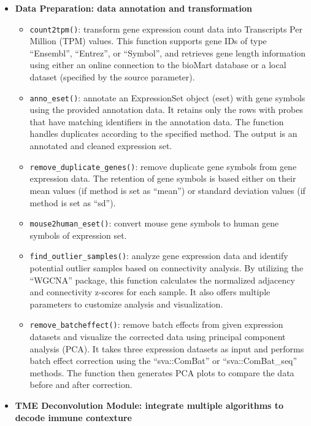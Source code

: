 \documentclass[
  12pt,
]{book}
\providecommand{\tightlist}{%
  \setlength{\itemsep}{0pt}\setlength{\parskip}{0pt}}
\begin{document}
\begin{itemize}
\item
  \textbf{Data Preparation: data annotation and transformation}

  \begin{itemize}
  \tightlist
  \item
    \texttt{count2tpm()}: transform gene expression count data into Transcripts Per Million (TPM) values. This function supports gene IDs of type ``Ensembl'', ``Entrez'', or ``Symbol'', and retrieves gene length information using either an online connection to the bioMart database or a local dataset (specified by the source parameter).
  \item
    \texttt{anno\_eset()}: annotate an ExpressionSet object (eset) with gene symbols using the provided annotation data. It retains only the rows with probes that have matching identifiers in the annotation data. The function handles duplicates according to the specified method. The output is an annotated and cleaned expression set.
  \item
    \texttt{remove\_duplicate\_genes()}: remove duplicate gene symbols from gene expression data. The retention of gene symbols is based either on their mean values (if method is set as ``mean'') or standard deviation values (if method is set as ``sd'').
  \item
    \texttt{mouse2human\_eset()}: convert mouse gene symbols to human gene symbols of expression set.
  \item
    \texttt{find\_outlier\_samples()}: analyze gene expression data and identify potential outlier samples based on connectivity analysis. By utilizing the ``WGCNA'' package, this function calculates the normalized adjacency and connectivity z-scores for each sample. It also offers multiple parameters to customize analysis and visualization.
  \item
    \texttt{remove\_batcheffect()}: remove batch effects from given expression datasets and visualize the corrected data using principal component analysis (PCA). It takes three expression datasets as input and performs batch effect correction using the ``sva::ComBat'' or ``sva::ComBat\_seq'' methods. The function then generates PCA plots to compare the data before and after correction.
  \end{itemize}
\item
  \textbf{TME Deconvolution Module: integrate multiple algorithms to decode immune contexture}


\end{itemize}
\end{document}

